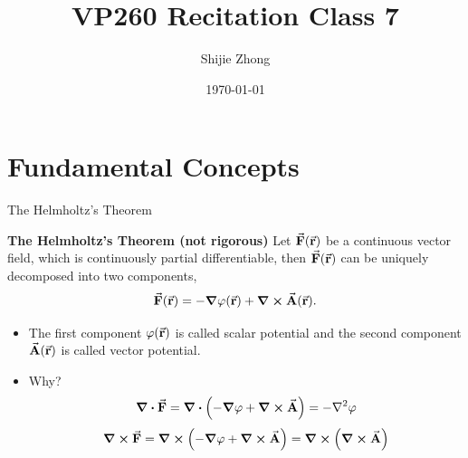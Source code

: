 \documentclass[9pt]{beamer}
\title[VP260 RC]{VP260 Recitation Class 7} %
\author{Shijie Zhong} %
\institute[UM-SJTU JI] %
{
    University of Michigan - Shanghai Jiao Tong University Joint Institute\\%
\medskip
}
\date{\today} %
\begin{document}
\begin{frame}
    \titlepage %
\end{frame}



\section{Fundamental Concepts} %

\begin{frame}{The Helmholtz's Theorem}
    \begin{beamerboxesrounded}[shadow=true]{\bf The Helmholtz's Theorem (not rigorous)}
        Let $\va{F}(\va{r})$  be a continuous vector field, which is continuously partial differentiable, then $\va{F}(\va{r})$ can be uniquely decomposed into two components,
        \begin{equation}
            \va{F} (\va{r}) = -\grad{\varphi(\va{r})} + \curl{\va{A}(\va{r})}.
        \end{equation}
    \end{beamerboxesrounded}

    \begin{itemize}
        \item The first component $\varphi(\va{r})$ is called scalar potential and the second component $\va{A} (\va{r})$ is called vector potential.
        \item Why?
        \begin{equation}
            \div{\va{F}} = \div(-\grad{\varphi} + \curl{\va{A}}) = -\laplacian{\varphi}
        \end{equation}
        \begin{equation}
            \curl{\va{F}} = \curl(-\grad{\varphi} + \curl{\va{A}}) = \curl(\curl{\va{A}})
        \end{equation}
    \end{itemize}

\end{frame}
\end{document}
